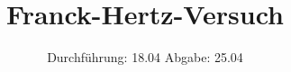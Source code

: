 

\subject{V601}
\title{Franck-Hertz-Versuch}
\date{
  Durchführung: 18.04
  \hspace{3em}
  Abgabe: 25.04
}



\maketitle
\thispagestyle{empty}
\tableofcontents
\newpage






\printbibliography


